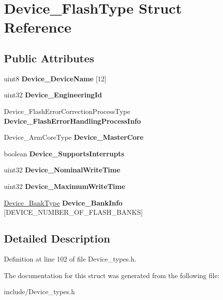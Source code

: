 \hypertarget{structDevice__FlashType}{}\section{Device\+\_\+\+Flash\+Type Struct Reference}
\label{structDevice__FlashType}
\subsection*{Public Attributes}
\begin{DoxyCompactItemize}
\item 
\mbox{\label{structDevice__FlashType_abf78449768dd16799a1283c2d8a27f31}} 
uint8 {\bfseries Device\+\_\+\+Device\+Name} \mbox{[}12\mbox{]}
\item 
\mbox{\label{structDevice__FlashType_a006331d513bceee09739e4c7ad1604e6}} 
uint32 {\bfseries Device\+\_\+\+Engineering\+Id}
\item 
\mbox{\label{structDevice__FlashType_a6969427f9535ca9cd6c479b12d763490}} 
Device\+\_\+\+Flash\+Error\+Correction\+Process\+Type {\bfseries Device\+\_\+\+Flash\+Error\+Handling\+Process\+Info}
\item 
\mbox{\label{structDevice__FlashType_a41262c765932ba4df4e7c3896e079da1}} 
Device\+\_\+\+Arm\+Core\+Type {\bfseries Device\+\_\+\+Master\+Core}
\item 
\mbox{\label{structDevice__FlashType_a91e8ae65b50de5f54117840688d0959e}} 
boolean {\bfseries Device\+\_\+\+Supports\+Interrupts}
\item 
\mbox{\label{structDevice__FlashType_a5a8f268f671af16425aaccb514b39c2a}} 
uint32 {\bfseries Device\+\_\+\+Nominal\+Write\+Time}
\item 
\mbox{\label{structDevice__FlashType_a9264efb04b812fbed8379485b5218cfc}} 
uint32 {\bfseries Device\+\_\+\+Maximum\+Write\+Time}
\item 
\mbox{\label{structDevice__FlashType_af5a83ba03dba6ff5697aefd461b2e647}} 
\mbox{\hyperlink{structDevice__BankType}{Device\+\_\+\+Bank\+Type}} {\bfseries Device\+\_\+\+Bank\+Info} \mbox{[}D\+E\+V\+I\+C\+E\+\_\+\+N\+U\+M\+B\+E\+R\+\_\+\+O\+F\+\_\+\+F\+L\+A\+S\+H\+\_\+\+B\+A\+N\+KS\mbox{]}
\end{DoxyCompactItemize}


\subsection{Detailed Description}


Definition at line 102 of file Device\+\_\+types.\+h.



The documentation for this struct was generated from the following file\+:\begin{DoxyCompactItemize}
\item 
include/Device\+\_\+types.\+h\end{DoxyCompactItemize}
